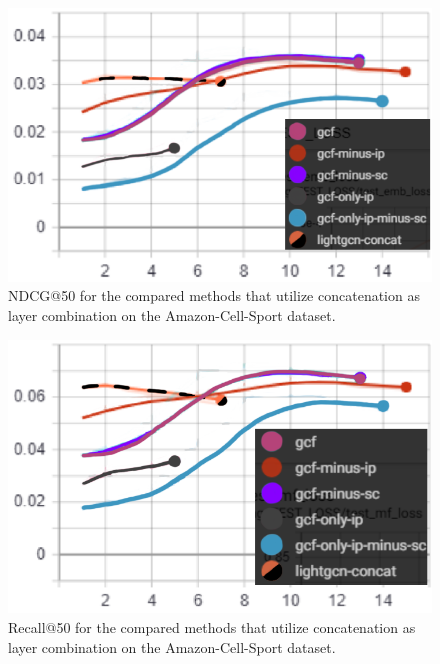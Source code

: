 \begin{figure}[h!]
    \includegraphics[width=\linewidth]{figures/amazon-cell-sport-gcf-ndcg.png}
    \caption{NDCG@50 for the compared methods that utilize concatenation as layer combination on the Amazon-Cell-Sport dataset.}
    \label{fig:GCF-NDCG-concat-ablation-study-Amazon-Cell-Sport}
\end{figure}
\begin{figure}[h!]
    \includegraphics[width=\linewidth]{figures/amazon-cell-sport-gcf-recall.png}
    \caption{Recall@50 for the compared methods that utilize concatenation as layer combination on the Amazon-Cell-Sport dataset.}
    \label{fig:GCF-recall-concat-ablation-study-Amazon-Cell-Sport}
\end{figure}
